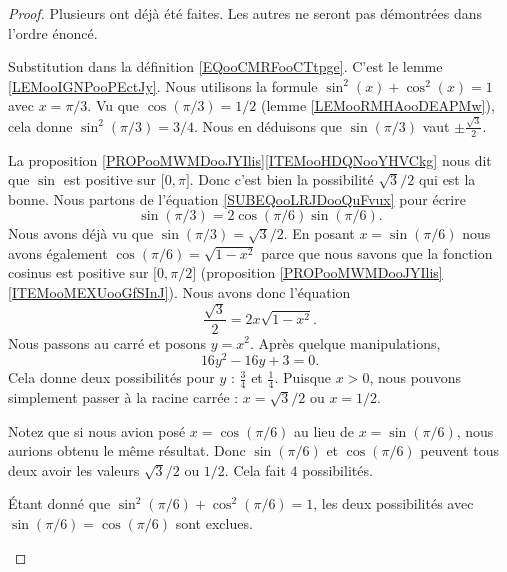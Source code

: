 \begin{proof}
	Plusieurs ont déjà été faites. Les autres ne seront pas démontrées dans l'ordre énoncé.
	\begin{subproof}
		\spitem[\( \sin(0)=0\)]
		Substitution dans la définition \eqref{EQooCMRFooCTtpge}.
		\spitem[\(  \sin(\pi/4)=\sqrt{ 2 }/2\)]
		C'est le lemme \ref{LEMooIGNPooPEctJy}.
		\spitem[\(  \sin(\pi/3)=1/\sqrt{ 2 }\)]
		Nous utilisons la formule \( \sin^2(x)+\cos^2(x)=1\) avec \( x=\pi/3\). Vu que \( \cos(\pi/3)=1/2\) (lemme \ref{LEMooRMHAooDEAPMw}), cela donne \( \sin^2(\pi/3)=3/4\). Nous en déduisons que \( \sin(\pi/3)\) vaut \( \pm\frac{\sqrt{3}}{  2 }\).

		La proposition \ref{PROPooMWMDooJYIlis}\ref{ITEMooHDQNooYHVCkg} nous dit que \( \sin\) est positive sur \(\mathopen[ 0 , \pi \mathclose]\). Donc c'est bien la possibilité \( \sqrt{3}/ 2\) qui est la bonne.
		\spitem[\( \sin(\pi/6)=1/2\) et \( \cos(\pi/6)=\sqrt{ 3 }/2 \)]
		Nous partons de l'équation \eqref{SUBEQooLRJDooQuFvux} pour écrire
		\begin{equation}
			\sin(\pi/3)=2\cos(\pi/6)\sin(\pi/6).
		\end{equation}
		Nous avons déjà vu que \( \sin(\pi/3)=\sqrt{ 3 }/2\). En posant \( x=\sin(\pi/6)\) nous avons également \( \cos(\pi/6)=\sqrt{ 1-x^2 }\) parce que nous savons que la fonction cosinus est positive sur \( \mathopen[ 0 , \pi/2 \mathclose]\) (proposition \ref{PROPooMWMDooJYIlis}\ref{ITEMooMEXUooGfSInJ}). Nous avons donc l'équation
		\begin{equation}
			\frac{ \sqrt{ 3 } }{2}=2x\sqrt{ 1-x^2 }.
		\end{equation}
		Nous passons au carré et posons \( y=x^2\). Après quelque manipulations,
		\begin{equation}
			16y^2-16y+3=0.
		\end{equation}
		Cela donne deux possibilités pour \( y\) : \( \frac{ 3 }{ 4 }\) et \( \frac{1}{ 4 }\). Puisque \( x>0\), nous pouvons simplement passer à la racine carrée : \( x=\sqrt{ 3 }/2\) ou \( x=1/2\).

		Notez que si nous avion posé \( x=\cos(\pi/6)\) au lieu de \( x=\sin(\pi/6)\), nous aurions obtenu le même résultat. Donc \( \sin(\pi/6)\) et \( \cos(\pi/6)\) peuvent tous deux avoir les valeurs \( \sqrt{ 3 }/2\) ou \( 1/2\). Cela fait \( 4\) possibilités.

		Étant donné que \( \sin^2(\pi/6)+\cos^2(\pi/6)=1\), les deux possibilités avec \( \sin(\pi/6)=\cos(\pi/6)\) sont exclues.


\end{subproof}
\end{proof}
